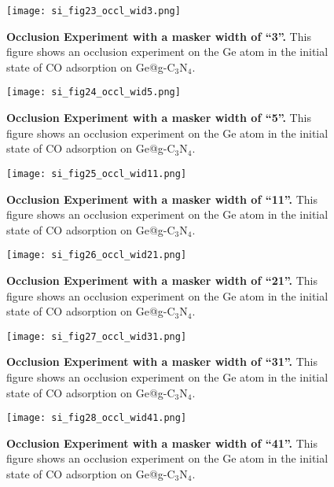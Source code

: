 \begin{figure}
  \centering
  \texttt{[image: si\_fig23\_occl\_wid3.png]}
  \caption{\textbf{Occlusion Experiment with a masker width of “3”.}
  This figure shows an occlusion experiment on the Ge atom in
  the initial state of CO adsorption on Ge@g-C$_3$N$_4$.}
  \label{si_fig23:occl_wid3}
\end{figure}


\begin{figure}
  \centering
  \texttt{[image: si\_fig24\_occl\_wid5.png]}
  \caption{\textbf{Occlusion Experiment with a masker width of “5”.}
  This figure shows an occlusion experiment on the Ge atom in
  the initial state of CO adsorption on Ge@g-C$_3$N$_4$.}
  \label{si_fig24:occl_wid5}
\end{figure}


\begin{figure}
  \centering
  \texttt{[image: si\_fig25\_occl\_wid11.png]}
  \caption{\textbf{Occlusion Experiment with a masker width of “11”.}
  This figure shows an occlusion experiment on the Ge atom in
  the initial state of CO adsorption on Ge@g-C$_3$N$_4$.}
  \label{si_fig25:occl_wid11}
\end{figure}


\begin{figure}
  \centering
  \texttt{[image: si\_fig26\_occl\_wid21.png]}
  \caption{\textbf{Occlusion Experiment with a masker width of “21”.}
  This figure shows an occlusion experiment on the Ge atom in
  the initial state of CO adsorption on Ge@g-C$_3$N$_4$.}
  \label{si_fig26:occl_wid21}
\end{figure}


\begin{figure}
  \centering
  \texttt{[image: si\_fig27\_occl\_wid31.png]}
  \caption{\textbf{Occlusion Experiment with a masker width of “31”.}
  This figure shows an occlusion experiment on the Ge atom in
  the initial state of CO adsorption on Ge@g-C$_3$N$_4$.}
  \label{si_fig27:occl_wid31}
\end{figure}


\begin{figure}
  \centering
  \texttt{[image: si\_fig28\_occl\_wid41.png]}
  \caption{\textbf{Occlusion Experiment with a masker width of “41”.}
  This figure shows an occlusion experiment on the Ge atom in
  the initial state of CO adsorption on Ge@g-C$_3$N$_4$.}
  \label{si_fig28:occl_wid41}
\end{figure}


